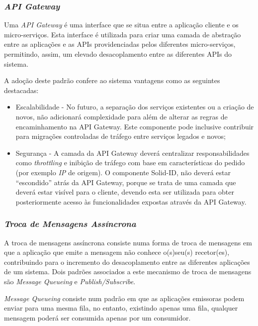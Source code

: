 \subsubsection*{\emph{API Gateway}} \label{api_gateway}
Uma \emph{API Gateway} é uma interface que se situa entre a aplicação cliente e os micro-serviços. Esta interface é utilizada para criar uma camada de abstração entre as aplicações e as APIs providenciadas pelos diferentes micro-serviços, permitindo, assim, um elevado desacoplamento entre as diferentes APIs do sistema.

A adoção deste padrão confere ao sistema vantagens como as seguintes destacadas:
\begin{itemize}
    \item Escalabilidade - No futuro, a separação dos serviços existentes ou a criação de novos, não adicionará complexidade para além de alterar as regras de encaminhamento na API Gateway. Este componente pode inclusive contribuir para migrações controladas de tráfego entre serviços legados e novos;
    
    \item Segurança - A camada da API Gateway deverá centralizar responsabilidades como \emph{throttling} e inibição de tráfego com base em características do pedido (por exemplo \emph{IP} de origem). O componente Solid-ID, não deverá estar “escondido” atrás da API Gateway, porque se trata de uma camada que deverá estar visível para o cliente, devendo esta ser utilizada para obter posteriormente acesso às funcionalidades expostas através da API Gateway.
\end{itemize}

\subsubsection*{\emph{Troca de Mensagens Assíncrona}} \label{troca_mensagens_assincrona}
A troca de mensagens assíncrona consiste numa forma de troca de mensagens em que a aplicação que emite a mensagem não conhece o(s)seu(s) recetor(es), contribuindo para o incremento do desacoplamento entre as diferentes aplicações de um sistema.
Dois padrões associados a este mecanismo de troca de mensagens são \emph{Message Queueing} e \emph{Publish/Subscribe}.

\emph{Message Queueing} \label{message_queueing} consiste num padrão em que as aplicações emissoras podem enviar para uma mesma fila, no entanto, existindo  apenas uma fila, qualquer mensagem poderá ser consumida apenas por um consumidor.

